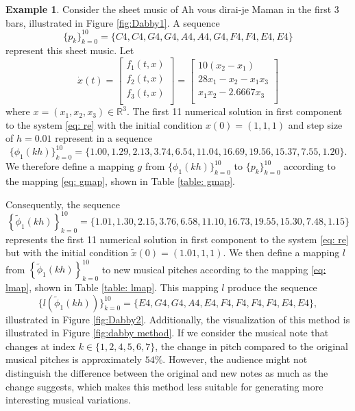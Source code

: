 \documentclass[11pt]{article}
\theoremstyle{definition}
\newtheorem{example}[theorem]{Example}
\begin{document}
\begin{example}
Consider the sheet music of Ah vous dirai-je Maman \cite{hinson_12_1987} in the first 3 bars, illustrated in Figure \ref{fig:Dabby1}. A sequence \[ \{p_k\}_{k=0}^{10} = \{C4, C4, G4, G4, A4, A4, G4, F4, F4, E4, E4 \} \] represent this sheet music. Let 
\begin{equation} \label{eq: re}
\dot{x}(t) = \begin{bmatrix}
 f_1(t, x) \\
 f_2(t, x) \\
 f_3(t, x) \\
\end{bmatrix}
= 
\begin{bmatrix}
  10(x_2 - x_1) \\
  28x_1 - x_2 - x_1x_3 \\
  x_1x_2 - 2.6667x_3 \\
\end{bmatrix}
\end{equation} 
where $x = (x_1, x_2, x_3) \in \mathbb{R}^3$. The first 11 numerical solution in first component to the system \eqref{eq: re} with the initial condition $x(0) = (1,1,1)$ and step size of $h=0.01$ represent in a sequence \[ \{ \phi_1(kh) \}_{k=0}^{10} = \{1.00, 1.29, 2.13, 3.74, 6.54, 11.04, 16.69, 19.56, 15.37, 7.55, 1.20\}. \]We therefore define a mapping $g$ from $\{ \phi_1(kh) \}_{k=0}^{10}$ to $\{p_k\}_{k=0}^{10}$ according to the mapping \eqref{eq: gmap}, shown in Table \ref{table: gmap}.


Consequently, the sequence 
\[ \left\{\tilde{\phi}_1(kh) \right\}_{k=0}^{10} = \{ 1.01, 1.30, 2.15, 3.76, 6.58, 11.10, 16.73, 19.55, 15.30, 7.48, 1.15 \} \] 
represents the first 11 numerical solution in first component to the system \eqref{eq: re} but with the initial condition $\tilde{x}(0) = (1.01,1,1)$. We then define a mapping $l$ from $\left\{\tilde{\phi}_1(kh) \right\}_{k=0}^{10}$ to new musical pitches according to the mapping \eqref{eq: lmap}, shown in Table \ref{table: lmap}.
This mapping $l$ produce the sequence \[ \{ l(\tilde{\phi}_1(kh)) \}_{k = 0}^{10} = \{E4, G4, G4, A4, E4, F4, F4, F4, F4, E4, E4 \}, \] illustrated in Figure \ref{fig:Dabby2}. Additionally, the visualization of this method is illustrated in Figure \ref{fig:dabby method}. If we consider the musical note that changes at index $k \in \{1, 2, 4, 5, 6, 7\}$, the change in pitch compared to the original musical pitches is approximately $54\%$. However, the audience might not distinguish the difference between the original and new notes as much as the change suggests, which makes this method less suitable for generating more interesting musical variations.


\end{example}
\end{document}
